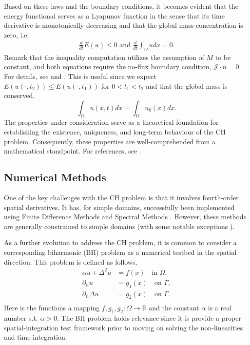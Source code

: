 Based on these laws and the boundary conditions, it becomes evident that the energy functional serves as a Lyapunov function in the sense that its time derivative is monotonically decreasing and that the global mass concentration is zero, i.e.
\[
    \begin{split}
\frac{d}{dt} E( u)  \le  0 \text{ and }\frac{d}{dt} \int_{\Omega }^{}  u dx = 0.
    \end{split}
\]
Remark that the inequality computation utilizes the assumption of $M$ to be constant, and both equations require the no-flux boundary condition, $\mathcal{J} \cdot n = 0$.
For details, see \cite[Equation 17 ]{lee2014physical} and \cite[Equation 1.7]{garcke2020weak}.
This is useful since we expect $E( u( \cdot , t_{2}) ) \le  E( u( \cdot , t_{1}) ) $ for $0 < t_{1} < t_{2} $ and that the global mass is conserved, \[
\int_{\Omega }^{} u ( x,t)  dx = \int_{\Omega }^{} u_{0}(x)  dx.
\]
The properties under consideration serve as a theoretical foundation for establishing the existence, uniqueness, and long-term behaviour of the CH problem. Consequently, these properties are well-comprehended from a mathematical standpoint. For
references, see \cite{abels2007convergence, cherfils2011cahn, elliott1986cahn}.

\subsection{Numerical Methods}%
\label{sub:numerical_methods}

One of the key challenges with the CH problem is that it involves fourth-order spatial derivatives. It has, for simple domains, successfully been implemented using Finite Difference Methods \cite{furihata2001stable,
cheng2019energy} and Spectral Methods \cite{liu2003phase, he2009class}. However, these methods are generally constrained to simple domains (with some notable exceptions \cite{li2013conservative, shen2009efficient, feng2009fourier}).

As a further evolution to address the CH problem, it is common to consider a corresponding biharmonic (BH) problem as a numerical testbed in the spatial direction. This problem is defined as follows,
\begin{equation}
\label{eq:BH-problem}
\begin{split}
    \alpha u + \Delta ^2 u  & = f( x) \quad \text{in }  \Omega, \\
    \partial _{n} u & = g_{1}( x)  \quad \text{on } \Gamma,   \\
    \partial _{n} \Delta  u & = g_{2}( x)  \quad \text{on } \Gamma.   \\
\end{split}
\end{equation}
Here is the functions a mapping $f,g_{1} ,g_{2}: \Omega  \to \mathbb{R} $ and the constant $\alpha  $ is a real number s.t. $\alpha >0$.
The BH problem holds relevance since it is provide a proper spatial-integration test framework prior to moving on solving the non-linearities and time-integration.

